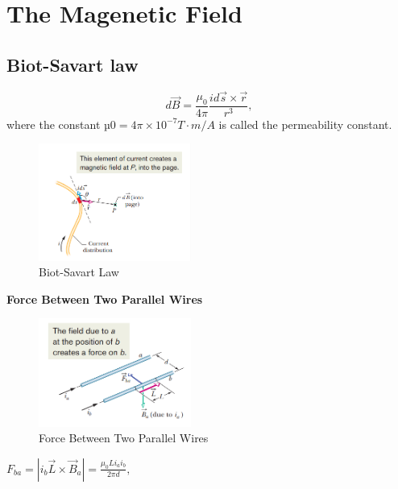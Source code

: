 \documentclass[11pt, a4paper]{article}
\begin{document}
\section{The Magenetic Field}
\subsection{Biot-Savart law}
$$d\vec{B}=\frac{\mu_0}{4\pi}\frac{id\vec{s}\times\vec{r}}{r^3},$$
where the constant $µ0 = 4π × 10^{−7} T · m/A$ is called the permeability constant.
\begin{figure}[htbp]
    \centering
    \includegraphics[width = 5cm]{Biot-Savart Law.png}
    \caption{Biot-Savart Law}
\end{figure}
\textbf{Force Between Two Parallel Wires}
\begin{figure}[htbp]
    \centering
    \includegraphics[width = 5cm]{Two Parallel Wires.png}
    \caption{Force Between Two Parallel Wires}
\end{figure}
$F_{ba}=|i_b\vec{L}\times\vec{B}_a|=\frac{\mu_0Li_ai_b}{2\pi d},$
\end{document}
